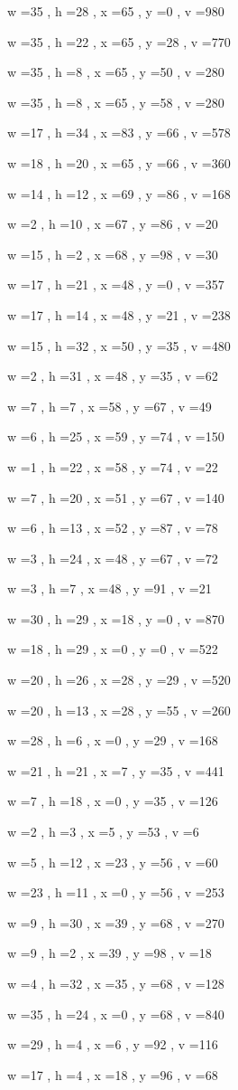 \documentclass[11pt]{article}
\begin{document}
w =35 , h =28 , x =65 , y =0 , v =980
\par
w =35 , h =22 , x =65 , y =28 , v =770
\par
w =35 , h =8 , x =65 , y =50 , v =280
\par
w =35 , h =8 , x =65 , y =58 , v =280
\par
w =17 , h =34 , x =83 , y =66 , v =578
\par
w =18 , h =20 , x =65 , y =66 , v =360
\par
w =14 , h =12 , x =69 , y =86 , v =168
\par
w =2 , h =10 , x =67 , y =86 , v =20
\par
w =15 , h =2 , x =68 , y =98 , v =30
\par
w =17 , h =21 , x =48 , y =0 , v =357
\par
w =17 , h =14 , x =48 , y =21 , v =238
\par
w =15 , h =32 , x =50 , y =35 , v =480
\par
w =2 , h =31 , x =48 , y =35 , v =62
\par
w =7 , h =7 , x =58 , y =67 , v =49
\par
w =6 , h =25 , x =59 , y =74 , v =150
\par
w =1 , h =22 , x =58 , y =74 , v =22
\par
w =7 , h =20 , x =51 , y =67 , v =140
\par
w =6 , h =13 , x =52 , y =87 , v =78
\par
w =3 , h =24 , x =48 , y =67 , v =72
\par
w =3 , h =7 , x =48 , y =91 , v =21
\par
w =30 , h =29 , x =18 , y =0 , v =870
\par
w =18 , h =29 , x =0 , y =0 , v =522
\par
w =20 , h =26 , x =28 , y =29 , v =520
\par
w =20 , h =13 , x =28 , y =55 , v =260
\par
w =28 , h =6 , x =0 , y =29 , v =168
\par
w =21 , h =21 , x =7 , y =35 , v =441
\par
w =7 , h =18 , x =0 , y =35 , v =126
\par
w =2 , h =3 , x =5 , y =53 , v =6
\par
w =5 , h =12 , x =23 , y =56 , v =60
\par
w =23 , h =11 , x =0 , y =56 , v =253
\par
w =9 , h =30 , x =39 , y =68 , v =270
\par
w =9 , h =2 , x =39 , y =98 , v =18
\par
w =4 , h =32 , x =35 , y =68 , v =128
\par
w =35 , h =24 , x =0 , y =68 , v =840
\par
w =29 , h =4 , x =6 , y =92 , v =116
\par
w =17 , h =4 , x =18 , y =96 , v =68
\par
\newpage
\end{document}
